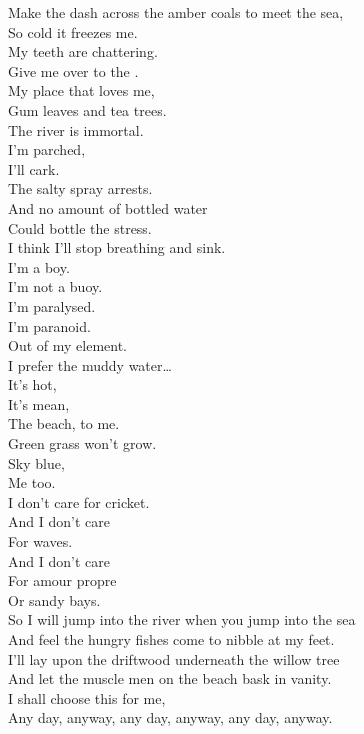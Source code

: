 Make the dash across the amber coals to meet the sea, \\
So cold it freezes me. \\
My teeth are chattering. \\
Give me over to the . \\
My place that loves me, \\
Gum leaves and tea trees. \\
The river is immortal. \\

I'm parched, \\
I'll cark. \\
The salty spray arrests. \\
And no amount of bottled water \\
Could bottle the stress. \\
I think I'll stop breathing and sink. \\
I'm a boy. \\
I'm not a buoy. \\
I'm paralysed. \\
I'm paranoid. \\
Out of my element. \\

I prefer the muddy water… \\

It's hot, \\
It's mean, \\
The beach, to me. \\
Green grass won't grow. \\
Sky blue, \\
Me too. \\
I don't care for cricket. \\
And I don't care \\
For waves. \\
And I don't care \\
For amour propre \\
Or sandy bays. \\

So I will jump into the river when you jump into the sea \\
And feel the hungry fishes come to nibble at my feet. \\
I'll lay upon the driftwood underneath the willow tree \\
And let the muscle men on the beach bask in vanity. \\

I shall choose this  for me, \\
Any day, anyway, any day, anyway, any day, anyway. \\

